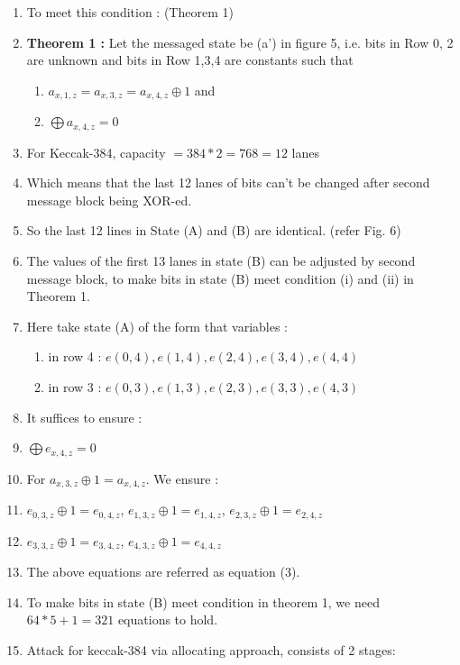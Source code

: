 \documentclass{article}
\begin{document}
\begin{enumerate}
    \item To meet this condition : (Theorem 1)
    \item \textbf{Theorem 1 :} Let the messaged state be (a') in figure 5, i.e. bits in Row 0, 2 are unknown and bits in Row 1,3,4 are constants such that 
    \begin{enumerate}
        \item $a_{x, 1, z} = a_{x, 3, z} = a_{x, 4, z} \oplus 1$ and
        \item $\bigoplus a_{x,4,z} = 0$ 
    \end{enumerate}
    \item For Keccak-384, capacity $= 384*2 = 768 = 12 $ lanes
    \item Which means that the last 12 lanes of bits can't be changed after second message block being XOR-ed.
    \item So the last 12 lines in State (A) and (B) are identical. (refer Fig. 6)
    \item The values of the first 13 lanes in state (B) can be adjusted by second message block, to make bits in state (B) meet condition (i) and (ii) in Theorem 1.
    \item Here take state (A) of the form that variables :
    \begin{enumerate}
        \item in row 4 : $e(0,4), e(1,4), e(2,4), e(3,4), e(4,4)$
        \item in row 3 : $e(0,3), e(1,3), e(2,3), e(3,3), e(4,3)$
    \end{enumerate}
    \item It suffices to ensure :
    \item $\bigoplus e_{x,4,z} = 0$
    \item For $ a_{x, 3, z}  \oplus 1 = a_{x, 4, z}$. We ensure :
    \item $e_{0,3,z} \oplus 1 = e_{0,4,z}$,  $e_{1,3,z} \oplus 1 = e_{1,4,z}$,  $e_{2,3,z} \oplus 1 = e_{2,4,z}$
    \item $e_{3,3,z} \oplus 1 = e_{3,4,z}$, $e_{4,3,z} \oplus 1 = e_{4,4,z}$
    \item The above equations are referred as equation (3).
    \item To make bits in state (B) meet condition in theorem 1, we need $64*5 + 1 = 321$ equations to hold.
    \item Attack for keccak-384 via allocating approach, consists of 2 stages:
    \begin{enumerate}

\end{enumerate}
\end{enumerate}
\end{document}
